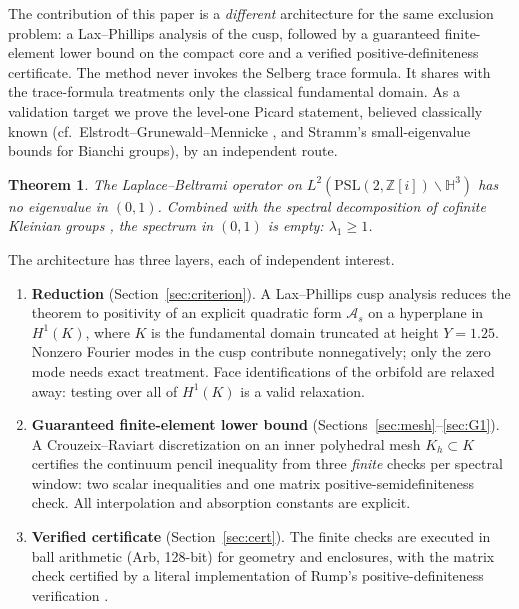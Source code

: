\documentclass[11pt]{amsart}
\newtheorem{theorem}{Theorem}[section]
\newcommand{\HH}{\mathbb{H}^3}
\newcommand{\ZZ}{\mathbb{Z}}
\newcommand{\PSL}{\mathrm{PSL}}
\begin{document}
The contribution of this paper is a \emph{different} architecture for
the same exclusion problem: a Lax--Phillips analysis of the cusp,
followed by a guaranteed finite-element lower bound on the compact core
and a verified positive-definiteness certificate.  The method never
invokes the Selberg trace formula.  It shares with the trace-formula
treatments only the classical fundamental domain.  As a validation
target we prove the level-one Picard statement, believed classically
known (cf.\ Elstrodt--Grunewald--Mennicke \cite{EGM98}, and Stramm's
small-eigenvalue bounds for Bianchi groups), by an independent route.

\begin{theorem}\label{thm:main}
The Laplace--Beltrami operator on
$L^2(\PSL(2,\ZZ[i])\backslash \HH)$ has no eigenvalue in
$(0,1)$.  Combined with the spectral decomposition of cofinite
Kleinian groups \cite[Thm.~3.8.1]{Friedman}, the spectrum in $(0,1)$ is
empty: $\lambda_1\ge 1$.
\end{theorem}

The architecture has three layers, each of independent interest.

\begin{enumerate}
\item \textbf{Reduction} (Section~\ref{sec:criterion}).
  A Lax--Phillips cusp analysis reduces the theorem to positivity of an
  explicit quadratic form $\mathcal{A}_s$ on a hyperplane in $H^1(K)$,
  where $K$ is the fundamental domain truncated at height $Y=1.25$.
  Nonzero Fourier modes in the cusp contribute nonnegatively; only the
  zero mode needs exact treatment.  Face identifications of the orbifold
  are relaxed away: testing over all of $H^1(K)$ is a valid relaxation.
\item \textbf{Guaranteed finite-element lower bound}
  (Sections~\ref{sec:mesh}--\ref{sec:G1}).
  A Crouzeix--Raviart discretization on an inner polyhedral mesh
  $K_h\subset K$ certifies the continuum pencil inequality from three
  \emph{finite} checks per spectral window: two scalar inequalities and
  one matrix positive-semidefiniteness check.  All interpolation and
  absorption constants are explicit.
\item \textbf{Verified certificate} (Section~\ref{sec:cert}).
  The finite checks are executed in ball arithmetic (Arb, 128-bit) for
  geometry and enclosures, with the matrix check certified by a literal
  implementation of Rump's positive-definiteness verification
  \cite{Rump06}.
\end{enumerate}
\end{document}
